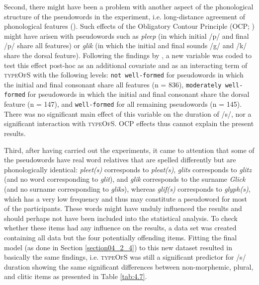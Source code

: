 Second, there might have been a problem with another aspect of the phonological structure of the pseudowords in the experiment, i.e. long-distance agreement of phonological features (\cite{Coetzee2009}). Such effects of the Obligatory Contour Principle (OCP; \cite{Coetzee2005}) might have arisen with pseudowords such as \textit{pleep} (in which initial /p/ and final /p/ share all features) or \textit{glik} (in which the initial and final sounds /g/ and /k/ share the dorsal feature). Following the findings by \citet{Coetzee2009}, a new variable was coded to test this effect post-hoc as an additional covariate and as an interacting term of \textsc{typeOfS} with the following levels: \texttt{not well-formed} for pseudowords in which the initial and final consonant share all features (n = 836), \texttt{moderately well-formed} for pseudowords in which the initial and final consonant share the dorsal feature (n = 147), and \texttt{well-formed} for all remaining pseudowords (n = 145). There was no significant main effect of this variable on the duration of /s/, nor a significant interaction with \textsc{typeOfS}. OCP effects thus cannot explain the present results.

Third, after having carried out the experiments, it came to attention that some of the pseudowords have real word relatives that are spelled differently but are phonologically identical:  \textit{pleet(s)} corresponds to \textit{pleat(s)}, \textit{glits} corresponds to \textit{glitz} (and no word corresponding to \textit{glit}), and \textit{glik} corresponds to the surname \textit{Glick} (and no surname corresponding to \textit{gliks}), whereas \textit{glif(s)} corresponds to \textit{glyph(s)}, which has a very low frequency and thus may constitute a pseudoword for most of the participants. These words might have unduly influenced the results and should perhaps not have been included into the statistical analysis. To check whether these items had any influence on the results, a data set was created containing all data but the four potentially offending items. Fitting the final model (as done in Section \ref{section04_2_4}) to this new dataset resulted in basically the same findings, i.e. \textsc{typeOfS} was still a significant predictor for /s/ duration showing the same significant differences between non-morphemic, plural, and clitic items as presented in Table \ref{tab:4.7}.

